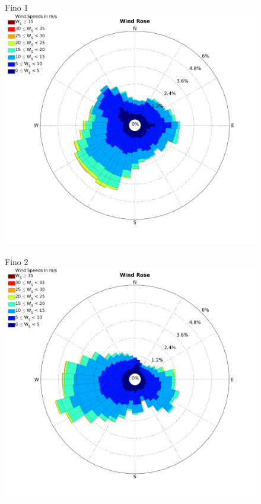 \documentclass[12pt,t]{beamer}
\begin{document}
\begin{frame}
\begin{figure}[htbp]
	\begin{center}
		\begin{minipage}[t]{0.45\linewidth}
			\centering
			Fino 1
			\includegraphics[width=\linewidth]{../../figures/WindRose_Fino1.png}
			
			
		\end{minipage}
		\begin{minipage}[t]{0.45\linewidth}
			\centering
			Fino 2
			\includegraphics[width=\linewidth]{../../figures/WindRose_Fino2.png}


\end{minipage}
\end{center}
\end{figure}
\end{frame}
\end{document}
